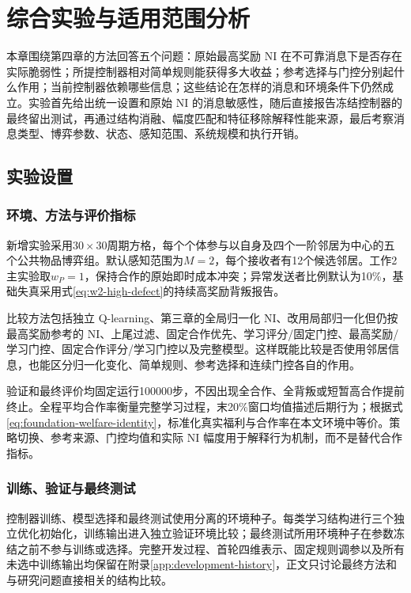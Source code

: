 \chapter{综合实验与适用范围分析}
\label{chap:evaluation}

本章围绕第四章的方法回答五个问题：原始最高奖励 NI 在不可靠消息下是否存在实际脆弱性；所提控制器相对简单规则能获得多大收益；参考选择与门控分别起什么作用；当前控制器依赖哪些信息；这些结论在怎样的消息和环境条件下仍然成立。实验首先给出统一设置和原始 NI 的消息敏感性，随后直接报告冻结控制器的最终留出测试，再通过结构消融、幅度匹配和特征移除解释性能来源，最后考察消息类型、博弈参数、状态、感知范围、系统规模和执行开销。

\section{实验设置}
\subsection{环境、方法与评价指标}

新增实验采用$30\times30$周期方格，每个个体参与以自身及四个一阶邻居为中心的五个公共物品博弈组。默认感知范围为$M=2$，每个接收者有12个候选邻居。工作2主实验取$w_P=1$，保持合作的原始即时成本冲突；异常发送者比例默认为10\%，基础失真采用式\eqref{eq:w2-high-defect}的持续高奖励背叛报告。

比较方法包括独立 Q-learning、第三章的全局归一化 NI、改用局部归一化但仍按最高奖励参考的 NI、上尾过滤、固定合作优先、学习评分/固定门控、最高奖励/学习门控、固定合作评分/学习门控以及完整模型。这样既能比较是否使用邻居信息，也能区分归一化变化、简单规则、参考选择和连续门控各自的作用。

验证和最终评价均固定运行100000步，不因出现全合作、全背叛或短暂高合作提前终止。全程平均合作率衡量完整学习过程，末20\%窗口均值描述后期行为；根据式\eqref{eq:foundation-welfare-identity}，标准化真实福利与合作率在本文环境中等价。策略切换、参考来源、门控均值和实际 NI 幅度用于解释行为机制，而不是替代合作指标。

\subsection{训练、验证与最终测试}

控制器训练、模型选择和最终测试使用分离的环境种子。每类学习结构进行三个独立优化初始化，训练输出进入独立验证环境比较；最终测试所用环境种子在参数冻结之前不参与训练或选择。完整开发过程、首轮四维表示、固定规则调参以及所有未选中训练输出均保留在附录\ref{app:development-history}，正文只讨论最终方法和与研究问题直接相关的结构比较。

